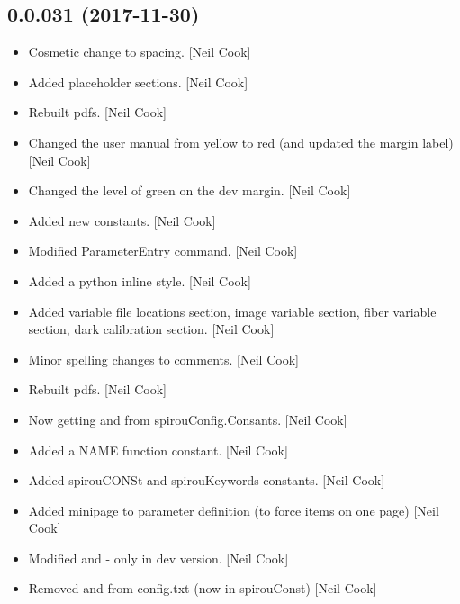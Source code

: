 \documentclass[a4paper,10pt,english]{report}
\begin{document}
\subsection{0.0.031 (2017-11-30)}
\label{\detokenize{misc/changelog:id521}}\begin{itemize}
\item {} 
Cosmetic change to spacing. {[}Neil Cook{]}

\item {} 
Added placeholder sections. {[}Neil Cook{]}

\item {} 
Rebuilt pdfs. {[}Neil Cook{]}

\item {} 
Changed the user manual from yellow to red (and updated the margin
label) {[}Neil Cook{]}

\item {} 
Changed the level of green on the dev margin. {[}Neil Cook{]}

\item {} 
Added new constants. {[}Neil Cook{]}

\item {} 
Modified ParameterEntry command. {[}Neil Cook{]}

\item {} 
Added a python inline style. {[}Neil Cook{]}

\item {} 
Added variable file locations section, image variable section, fiber
variable section, dark calibration section. {[}Neil Cook{]}

\item {} 
Minor spelling changes to comments. {[}Neil Cook{]}

\item {} 
Rebuilt pdfs. {[}Neil Cook{]}

\item {} 
Now getting  and  from spirouConfig.Consants. {[}Neil
Cook{]}

\item {} 
Added a NAME function constant. {[}Neil Cook{]}

\item {} 
Added spirouCONSt and spirouKeywords constants. {[}Neil Cook{]}

\item {} 
Added minipage to parameter definition (to force items on one page)
{[}Neil Cook{]}

\item {} 
Modified  and  - only in dev version. {[}Neil Cook{]}

\item {} 
Removed  and  from config.txt (now in spirouConst)
{[}Neil Cook{]}

\end{itemize}
\end{document}

